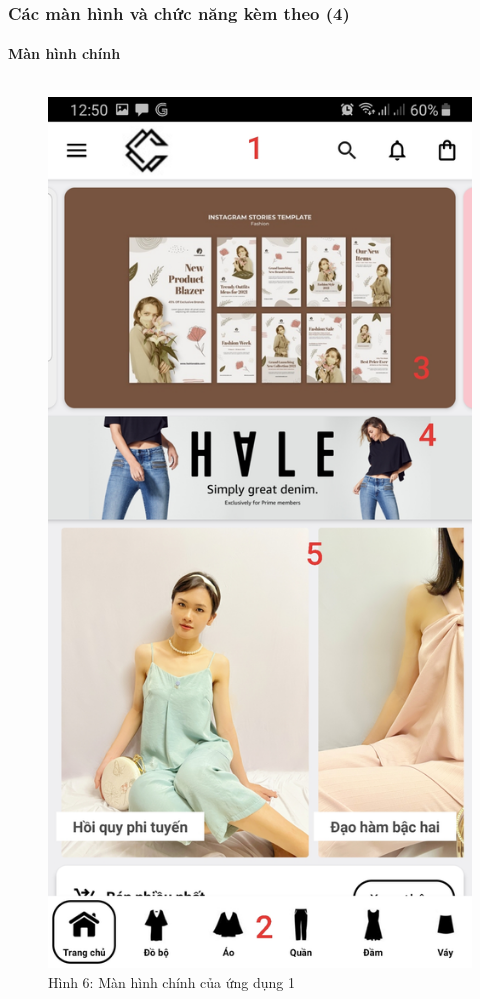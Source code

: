 \documentclass{beamer}
\begin{document}
\begin{frame}
    \frametitle{Các màn hình và chức năng kèm theo (4)}
    \framesubtitle{Màn hình chính}

    \begin{columns}
        \begin{figure}
            \centering
            \includegraphics[height=0.7\textheight]{images/06.png}
            \caption{\centering\tiny{Hình 6: Màn hình chính của ứng dụng 1}}


\end{figure}
\end{columns}
\end{frame}
\end{document}
